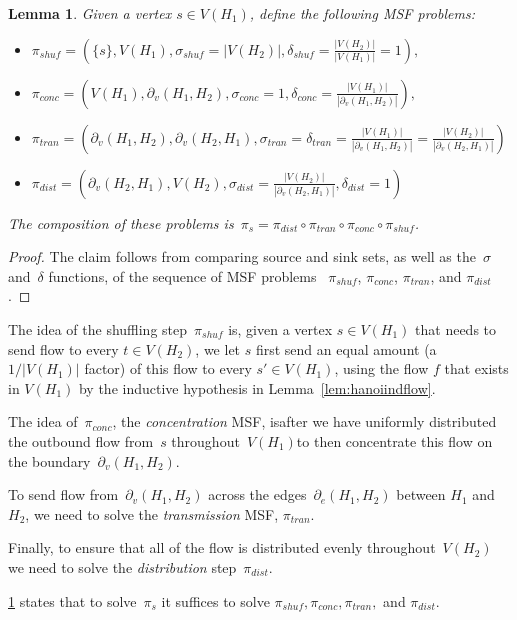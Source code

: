 \documentclass[
final
]{dmtcs-episciences}
\newcommand{\edgeh}[2]{\partial_e(#1,#2)}
\newcommand{\bdryh}[2]{\partial_v(#1,#2)}
\newtheorem{lemma}[theorem]{Lemma}
\begin{document}
\begin{lemma}
    \label{lem:sproblems}
    Given a vertex $s \in V(H_1)$, define the following MSF problems:
    \begin{itemize}
        \item $\pi_{shuf} = \left(\{s\}, V(H_1), \sigma_{shuf} = |V(H_2)|, \delta_{shuf} = \frac{|V(H_2)|}{|V(H_1)|} = 1\right),$
        \item $\pi_{conc} = \left(V(H_1), \bdryh{H_1}{H_2}, \sigma_{conc} = 1, \delta_{conc} = \frac{|V(H_1)|}{|\bdryh{H_1}{H_2}|}\right),$
        \item $\pi_{tran} = \left(\bdryh{H_1}{H_2}, \bdryh{H_2}{H_1}, \sigma_{tran} = \delta_{tran} = \frac{|V(H_1)|}{|\bdryh{H_1}{H_2}|} = \frac{|V(H_2)|}{|\bdryh{H_2}{H_1}|}\right)$
        \item $\pi_{dist} = \left(\bdryh{H_2}{H_1}, V(H_2), \sigma_{dist} = \frac{|V(H_2)|}{|\bdryh{H_2}{H_1}|}, \delta_{dist} = 1\right)$
    \end{itemize}
    The composition of these problems is~$\pi_s = \pi_{dist} \circ \pi_{tran} \circ \pi_{conc} \circ \pi_{shuf}$.
\end{lemma}
\begin{proof}
    The claim follows from comparing source and sink sets, as well as the~$\sigma$ and~$\delta$ functions, of the sequence of MSF problems ~$\pi_{shuf}$, $\pi_{conc}$, $\pi_{tran}$, and $\pi_{dist}$.
\end{proof}

The idea of the shuffling step~$\pi_{shuf}$ is, given a vertex $s \in V(H_1)$ that needs to send flow to every $t \in V(H_2)$, we let $s$ first send an equal amount (a $1/|V(H_1)|$ factor) of this flow to every $s' \in V(H_1)$, using the flow $f$ that exists in $V(H_1)$ by the inductive hypothesis in Lemma~\ref{lem:hanoiindflow}.

The idea of~$\pi_{conc}$, the \emph{concentration} MSF, is\textemdash after we have uniformly distributed the outbound flow from~$s$ throughout~$V(H_1)$\textemdash to then concentrate this flow on the boundary~$\bdryh{H_1}{H_2}$.

To send flow from~$\bdryh{H_1}{H_2}$ across the edges~$\edgeh{H_1}{H_2}$ between $H_1$ and $H_2$, we need to solve the \emph{transmission} MSF,
$\pi_{tran}.$

Finally, to ensure that all of the flow is distributed evenly throughout~$V(H_2)$ we need to solve the \emph{distribution} step~$\pi_{dist}$.

\cref{lem:sproblems} states that to solve~$\pi_s$ it suffices to solve $\pi_{shuf}, \pi_{conc}, \pi_{tran},$ and $\pi_{dist}$.
\end{document}
